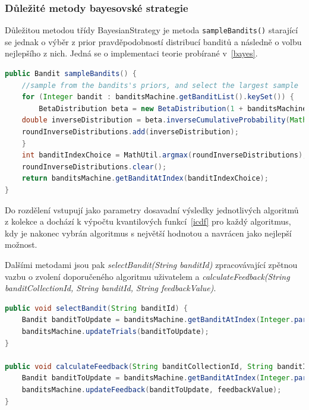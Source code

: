 \documentclass[thesis=M,czech]{FITthesis}[2014/05/07]
\begin{document}
\subsubsection{Důležité metody bayesovské strategie}
	Důležitou metodou třídy BayesianStrategy je metoda \texttt{sampleBandits()} starající se jednak o výběr z prior pravděpodobností distribucí banditů a následně o volbu nejlepšího z nich. Jedná se o implementaci teorie probírané v~\ref{bayes}.
	
\begin{lstlisting}[language=java]
public Bandit sampleBandits() {
    //sample from the bandits's priors, and select the largest sample
    for (Integer bandit : banditsMachine.getBanditList().keySet()) {
        BetaDistribution beta = new BetaDistribution(1 + banditsMachine.getBanditAtIndex(bandit).getSuccesses(), 1 + banditsMachine.getBanditAtIndex(bandit).getTrials() - banditsMachine.getBanditAtIndex(bandit).getSuccesses());
    double inverseDistribution = beta.inverseCumulativeProbability(Math.random());
    roundInverseDistributions.add(inverseDistribution);
    }
    int banditIndexChoice = MathUtil.argmax(roundInverseDistributions);
    roundInverseDistributions.clear();
    return banditsMachine.getBanditAtIndex(banditIndexChoice);
}
\end{lstlisting}	

Do rozdělení vstupují jako parametry dosavadní výsledky jednotlivých algoritmů z kolekce a dochází k výpočtu kvantilových funkcí~\ref{icdf} pro každý algoritmus, kdy je nakonec vybrán algoritmus s největší hodnotou a navrácen jako nejlepší možnost. 

Dalšími metodami jsou pak \emph{selectBandit(String banditId)} zpracovávající zpětnou vazbu o zvolení doporučeného algoritmu uživatelem a \emph{calculateFeedback(String banditCollectionId, String banditId, String feedbackValue)}. 

\begin{lstlisting}[language=java]
public void selectBandit(String banditId) {
    Bandit banditToUpdate = banditsMachine.getBanditAtIndex(Integer.parseInt(banditId));        
    banditsMachine.updateTrials(banditToUpdate);           
}

public void calculateFeedback(String banditCollectionId, String banditId, String feedbackValue) {
    Bandit banditToUpdate = banditsMachine.getBanditAtIndex(Integer.parseInt(banditId));
    banditsMachine.updateFeedback(banditToUpdate, feedbackValue);   
}  
\end{lstlisting}	
\end{document}
